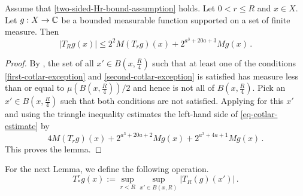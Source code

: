 \begin{lemma}
\label{Cotlar-estimate}
\leanok
{}
Assume that \eqref{two-sided-Hr-bound-assumption} holds.
Let $0<r\le R$ and  $x\in X$. Let $g:X\to\mathbb{C}$ be a bounded measurable function supported on a set of finite measure. Then
\begin{equation}\label{eq-cotlar-estimate}
|T_Rg(x)| \le 2^{2}M(T_rg)(x)+ 2^{a^3+20a+3} Mg(x)
\, .
\end{equation}
\end{lemma}


\begin{proof}
\leanok
By , the set of all $x'\in B(x,\frac {R} 4)$
such that at least one of the conditions
\eqref{first-cotlar-exception} and
\eqref{second-cotlar-exception} is satisfied has measure less than or equal to $\mu(B(x,\frac{R}{4}))/2$ and hence is not all of $B(x,\frac {R} 4)$.
Pick an $x'\in B(x,\frac {R} 4)$ such that both conditions are not satisfied.
Applying  for this $x'$ and using the triangle inequality
estimates the left-hand side of \eqref{eq-cotlar-estimate}
by
\begin{equation}
    4 M(T_rg)(x) + 2^{a^3 + 20a + 2} Mg(x) + 2^{a^3 + 4a + 1} Mg(x)\, .
\end{equation}
This proves the lemma.
\end{proof}

For the next Lemma, we define the following operation.
\begin{equation}\label{eq-simple--nontangential}
    T_{*}^r g(x):=\sup_{r<R}\sup_{x'\in B(x,R)} |T_R(g)(x')| \, .
\end{equation}

